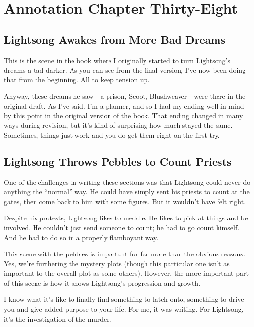 \section{Annotation Chapter Thirty-Eight}

\subsection*{Lightsong Awakes from More Bad Dreams}

This is the scene in the book where I originally started to turn Lightsong’s dreams a tad darker. As you can see from the final version, I’ve now been doing that from the beginning. All to keep tension up.

Anyway, these dreams he saw—a prison, Scoot, Blushweaver—were there in the original draft. As I’ve said, I’m a planner, and so I had my ending well in mind by this point in the original version of the book. That ending changed in many ways during revision, but it’s kind of surprising how much stayed the same. Sometimes, things just work and you do get them right on the first try.

\subsection*{Lightsong Throws Pebbles to Count Priests}

One of the challenges in writing these sections was that Lightsong could never do anything the “normal” way. He could have simply sent his priests to count at the gates, then come back to him with some figures. But it wouldn’t have felt right.

Despite his protests, Lightsong likes to meddle. He likes to pick at things and be involved. He couldn’t just send someone to count; he had to go count himself. And he had to do so in a properly flamboyant way.

This scene with the pebbles is important for far more than the obvious reasons. Yes, we’re furthering the mystery plots (though this particular one isn’t as important to the overall plot as some others). However, the more important part of this scene is how it shows Lightsong’s progression and growth.

I know what it’s like to finally find something to latch onto, something to drive you and give added purpose to your life. For me, it was writing. For Lightsong, it’s the investigation of the murder.



